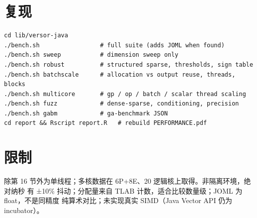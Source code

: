 \documentclass[10pt,a4paper]{article}
\begin{document}
\section{复现}
\begin{verbatim}
cd lib/versor-java
./bench.sh                 # full suite (adds JOML when found)
./bench.sh sweep           # dimension sweep only
./bench.sh robust          # structured sparse, thresholds, sign table
./bench.sh batchscale      # allocation vs output reuse, threads, blocks
./bench.sh multicore       # gp / op / batch / scalar thread scaling
./bench.sh fuzz            # dense-sparse, conditioning, precision
./bench.sh gabm            # ga-benchmark JSON
cd report && Rscript report.R   # rebuild PERFORMANCE.pdf
\end{verbatim}

\section{限制}
除第 16 节外为单线程；多核数据在 6P+8E、20 逻辑核上取得。非隔离环境，绝对纳秒
有 ±10\% 抖动；分配量来自 TLAB 计数，适合比较数量级；JOML 为 float，不是同精度
纯算术对比；未实现真实 SIMD（Java Vector API 仍为 incubator）。
\end{document}
